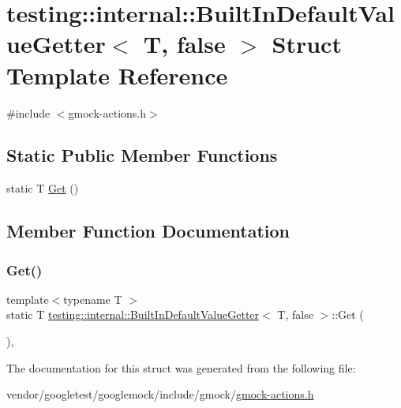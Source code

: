 \hypertarget{structtesting_1_1internal_1_1_built_in_default_value_getter_3_01_t_00_01false_01_4}{}\section{testing\+:\+:internal\+:\+:Built\+In\+Default\+Value\+Getter$<$ T, false $>$ Struct Template Reference}
\label{structtesting_1_1internal_1_1_built_in_default_value_getter_3_01_t_00_01false_01_4}


{\ttfamily \#include $<$gmock-\/actions.\+h$>$}

\subsection*{Static Public Member Functions}
\begin{DoxyCompactItemize}
\item 
static T \hyperlink{structtesting_1_1internal_1_1_built_in_default_value_getter_3_01_t_00_01false_01_4_a8c8e929666f61272961eea21a60de4ad}{Get} ()
\end{DoxyCompactItemize}


\subsection{Member Function Documentation}
\mbox{\label{structtesting_1_1internal_1_1_built_in_default_value_getter_3_01_t_00_01false_01_4_a8c8e929666f61272961eea21a60de4ad}} 
\subsubsection{\texorpdfstring{Get()}{Get()}}
{\footnotesize\ttfamily template$<$typename T $>$ \\
static T \hyperlink{structtesting_1_1internal_1_1_built_in_default_value_getter}{testing\+::internal\+::\+Built\+In\+Default\+Value\+Getter}$<$ T, false $>$\+::Get (\begin{DoxyParamCaption}{ }\end{DoxyParamCaption})\hspace{0.3cm}{\ttfamily [inline]}, {\ttfamily [static]}}



The documentation for this struct was generated from the following file\+:\begin{DoxyCompactItemize}
\item 
vendor/googletest/googlemock/include/gmock/\hyperlink{gmock-actions_8h}{gmock-\/actions.\+h}\end{DoxyCompactItemize}
